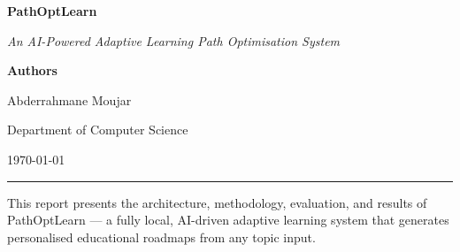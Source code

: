 \documentclass[12pt,a4paper]{article}
\begin{document}
\begin{titlepage}
  \centering
  \vspace*{2cm}

  {\Huge\bfseries PathOptLearn\par}
  \vspace{0.5cm}
  {\Large\itshape An AI-Powered Adaptive Learning Path Optimisation System\par}
  \vspace{2cm}

  \vspace{1.5cm}

  {\large\bfseries Authors}\par
  \vspace{0.3cm}
  {\large Abderrahmane Moujar\par}
  \vspace{2cm}

  {\large Department of Computer Science\par}
  \vspace{0.3cm}
  {\large \today\par}

  \vfill
  \rule{\linewidth}{0.5pt}
  {\small This report presents the architecture, methodology, evaluation, and
  results of PathOptLearn — a fully local, AI-driven adaptive learning system
  that generates personalised educational roadmaps from any topic input.}
\end{titlepage}
\end{document}
